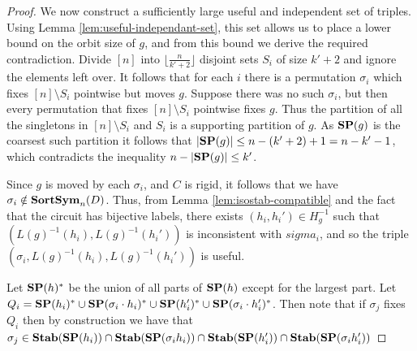 \documentclass[../paper.tex]{subfiles}
\begin{document}
\begin{proof}
  We now construct a sufficiently large useful and independent set of triples.
  Using Lemma \ref{lem:useful-independant-set}, this set allows us to place a
  lower bound on the orbit size of $g$, and from this bound we derive the
  required contradiction. Divide $[n]$ into $\lfloor \frac{n}{k' + 2} \rfloor$
  disjoint sets $S_i$ of size $k' + 2$ and ignore the elements left over. It
  follows that for each $i$ there is a permutation $\sigma_i$ which fixes $[n]
  \setminus S_i$ pointwise but moves $g$. Suppose there was no such $\sigma_i$,
  but then every permutation that fixes $[n]\setminus S_i$ pointwise fixes $g$.
  Thus the partition of all the singletons in $[n]\setminus S_i$ and $S_i$ is a
  supporting partition of $g$. As $\text{\textbf{SP}}(g)$ is the coarsest such partition it
  follows that $\vert \text{\textbf{SP}}(g) \vert \leq n - (k'+2) + 1 = n - k' - 1$, which
  contradicts the inequality $n - \vert \text{\textbf{SP}}(g) \vert \leq k'$.

  Since $g$ is moved by each $\sigma_i$, and $C$ is rigid, it follows that we
  have $\sigma_i \notin \text{\textbf{SortSym}}_n(D)$. Thus, from Lemma
  \ref{lem:isostab-compatible} and the fact that the circuit has bijective
  labels, there exists $(h_i, h_i') \in H^{-1}_g$ such that $(L(g)^{-1}(h_i),
  L(g)^{-1}(h_i'))$ is inconsistent with $sigma_i$, and so the triple
  $(\sigma_i, L(g)^{-1}(h_i), L(g)^{-1}(h_i'))$ is useful.

  Let $\text{\textbf{SP}} (h)^*$ be the union of all parts of $\text{\textbf{SP}}(h)$ except for the largest
  part. Let $Q_i = \text{\textbf{SP}}(h_i)^* \cup \text{\textbf{SP}}(\sigma_i \cdot h_i)^* \cup \text{\textbf{SP}} (h_i')^*
  \cup \text{\textbf{SP}} (\sigma_i \cdot h_i')^*$. Then note that if $\sigma_j$ fixes $Q_i$
  then by construction we have that $\sigma_j \in \text{\textbf{Stab}}(\text{\textbf{SP}}(h_i)) \cap
  \text{\textbf{Stab}}(\text{\textbf{SP}}(\sigma_i h_i)) \cap \text{\textbf{Stab}}(\text{\textbf{SP}}(h_i')) \cap \text{\textbf{Stab}}(\text{\textbf{SP}}(\sigma_i h_i'))$


\end{proof}
\end{document}
